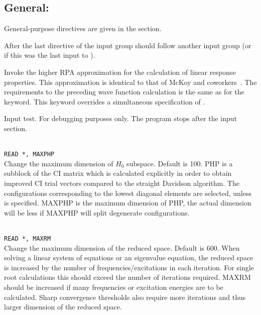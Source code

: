 \subsection{General: }

General-purpose directives are given in the  section.

After the last directive of the  input group
should follow another {} input group
(or  if this was the last input to \dalton).

\begin{description}

\item{}
Invoke the higher RPA approximation for the calculation of linear
response properties.
This approximation is identical to that of McKoy
and coworkers~\cite{jrtsvmjcp58,tsjrvmjcp58}. The requirements to the
preceding wave function
calculation is the same as for the  keyword.
This keyword overrides a simultaneous specification of .

\item{}
Input test. For debugging purposes only. The program stops after the
input section.

\item{}\\
\verb|READ *, MAXPHP|\\
Change the maximum dimension of $H_0$ subspace.   Default is 100.
PHP is a subblock of the CI matrix which is calculated explicitly
in order to obtain improved CI trial vectors compared to the
straight Davidson algorithm\cite{erdjcp17}.  The configurations
corresponding to
the lowest diagonal elements are selected, unless  is
specified. MAXPHP is the maximum dimension of PHP, the
actual dimension will be less if MAXPHP will split degenerate configurations.

\item{}\\
\verb|READ *, MAXRM |\\
Change the maximum dimension of the reduced space. Default is 600.
When solving a linear system of equations or an eigenvalue equation,
the reduced space is increased by the number of
frequencies/excitations in each iteration. For single root
calculations this should exceed the number of iterations required.
MAXRM should be increased if many frequencies or excitation energies
are to be calculated.
Sharp convergence thresholds also require
more iterations and thus larger dimension of the reduced space.


\end{description}
